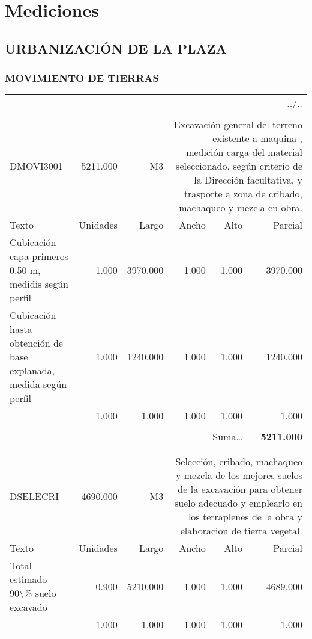\documentclass{book}%
\begin{document}
%
\normalsize%
\part{Mediciones}%
\label{sec:Mediciones}%
\chapter{URBANIZACIÓN DE LA PLAZA}%
\label{sec:URBANIZACINDELAPLAZA}%
\section{MOVIMIENTO DE TIERRAS}%
\label{sec:MOVIMIENTODETIERRAS}%
\begin{longtable}{lrrrrr}%
\multicolumn{6}{r}{../..}\\%
\endfoot%
\endlastfoot%
&&&&&\\%
DMOVI3001&5211.000& M3&\multicolumn{3}{p{6cm}}{\scriptsize Excavación general del terreno existente a maquina , medición carga del material seleccionado, según criterio de la Dirección facultativa, y trasporte a zona de cribado, machaqueo y mezcla en obra.\normalsize}\\%
Texto&Unidades&Largo&Ancho&Alto&Parcial\\%
\hline%
\multicolumn{1}{p{3.5cm}}{Cubicación capa primeros 0.50 m, medidis según perfil}&1.000&3970.000&1.000&1.000&3970.000\\%
\multicolumn{1}{p{3.5cm}}{Cubicación hasta obtención de base explanada, medida según perfil}&1.000&1240.000&1.000&1.000&1240.000\\%
\multicolumn{1}{p{3.5cm}}{}&1.000&1.000&1.000&1.000&1.000\\%
&&&&&\\%
\multicolumn{5}{r}{Suma\ldots}&\textbf{5211.000}\\%
\hline%
&&&&&\\%
&&&&&\\%
DSELECRI&4690.000& M3&\multicolumn{3}{p{6cm}}{\scriptsize Selección, cribado, machaqueo y mezcla de los mejores suelos de la excavación para obtener suelo adecuado y emplearlo en los terraplenes de la obra y elaboracion de tierra vegetal.\normalsize}\\%
Texto&Unidades&Largo&Ancho&Alto&Parcial\\%
\hline%
\multicolumn{1}{p{3.5cm}}{Total estimado 90\textbackslash{}\% suelo excavado}&0.900&5210.000&1.000&1.000&4689.000\\%
\multicolumn{1}{p{3.5cm}}{}&1.000&1.000&1.000&1.000&1.000\\%

\end{longtable}
\end{document}
